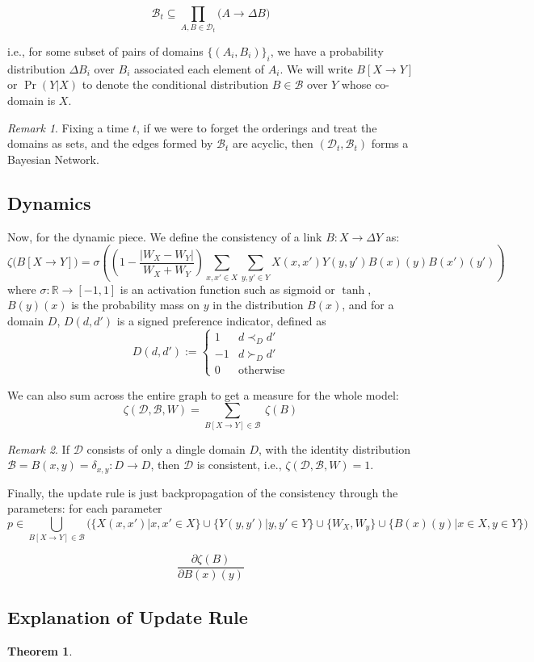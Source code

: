\documentclass{article}
\theoremstyle{plain}
\newtheorem{theorem}{Theorem}[section]
\theoremstyle{definition}
\theoremstyle{remark}
\newtheorem*{remark}{Remark}
\begin{document}
	\[  \mathcal B_t \subseteq \prod_{A, B \in \mathcal D_t} \Big( A \to \Delta B \Big) \] 
	
	i.e., for some subset of pairs of domains $\{ (A_i, B_i) \}_i$, we have a probability distribution $\Delta B_i$ over $B_i$ associated each element of $A_i$. We will write $B [X \to Y]$ or $\Pr(Y | X)$ to denote the conditional distribution $B \in \mathcal B$ over $Y$ whose co-domain is $X$.
	
	
	\begin{remark}
		Fixing a time $t$, if we were to forget the orderings and treat the domains as sets, and the edges formed by $\mathcal B_t$ are acyclic, then $(\mathcal D_t, \mathcal B_t)$ forms a Bayesian Network.
	\end{remark}
	
	
	
	\subsection{Dynamics}
	
	Now, for the dynamic piece. We define the consistency of a link $B : X \to \Delta Y$ as: 	
	\[ \zeta\big(B[X \to Y]\big) =  \sigma \left( \left(1- \frac{|W_X - W_Y|}{W_X + W_Y}\right) \sum_{x,x' \in X}\sum_{y,y' \in Y} X(x,x') Y(y,y') B(x)(y) B(x')(y') \right) \]
	where $\sigma : \mathbb R \to [-1, 1]$ is an activation function such as sigmoid or $\tanh$, $B(y)(x)$ is the probability mass on $y$ in the distribution $B(x)$, and for a domain $D$, $D(d, d')$ is a signed preference indicator, defined as 
	\[ D(d, d') := \begin{cases}
	1 & d \prec_D d' \\
	-1 & d \succ_D d' \\
	0 & \text{otherwise}
	\end{cases} \]
	
	We can also sum across the entire graph to get a measure for the whole model:
	\[ \zeta(\mathcal D, \mathcal B, W) = \sum_{B[X\to Y] \in \mathcal B}~ \zeta(B) \]
	
	
	\begin{remark}
		If $\mathcal D$ consists of only a dingle domain $D$, with the identity distribution $\mathcal B = {B(x,y) = \delta_{x,y}: D \to D}$, then $\mathcal D$ is consistent, i.e., $\zeta(\mathcal D, \mathcal B, W) = 1$.
	\end{remark}
	
	Finally, the update rule is just backpropagation of the consistency through the parameters: for each parameter 
	\[ p \in \bigcup_{B[X\to Y] \in \mathcal B}  \Bigg( \{ X(x,x') | x, x' \in X\} \cup \{ Y(y, y') | y,y' \in Y\} \cup \{ W_X, W_y \} \cup \{B(x)(y) | x \in X, y \in Y\}  \Bigg) \]
	
	\[ \frac{\partial \zeta(B) }{\partial B(x)(y) } \]
	
	\subsection{Explanation of Update Rule}	 
	
	
	\begin{theorem}
		
	\end{theorem}

%	
%	
\end{document}
